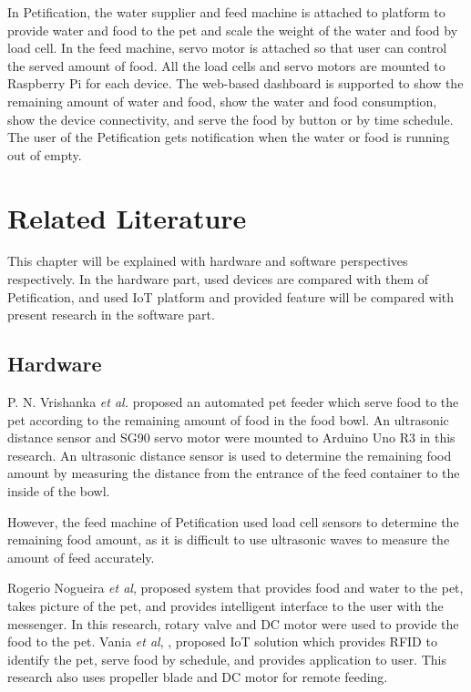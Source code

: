 \documentclass[conference]{IEEEtran}
\begin{document}
In Petification, the water supplier and feed machine is attached to platform to provide water and food to the pet and scale the weight of the water and food by load cell. In the feed machine, servo motor is attached so that user can control the served amount of food. All the load cells and servo motors are mounted to Raspberry Pi for each device.
The web-based dashboard is supported to show the remaining amount of water and food, show the water and food consumption, show the device connectivity, and serve the food by button or by time schedule. The user of the Petification gets notification when the water or food is running out of empty.

\section{Related Literature}
This chapter will be explained with hardware and software perspectives respectively. In the hardware part, used devices are compared with them of Petification, and used IoT platform and provided feature will be compared with present research in the software part.

\subsection{Hardware}
P. N. Vrishanka \textit{et al.} \cite{b11} proposed an automated pet feeder which serve food to the pet according to the remaining amount of food in the food bowl. An ultrasonic distance sensor and SG90 servo motor were mounted to Arduino Uno R3 in this research. An ultrasonic distance sensor is used to determine the remaining food amount by measuring the distance from the entrance of the feed container to the inside of the bowl.

However, the feed machine of Petification used load cell sensors to determine the remaining food amount, as it is difficult to use ultrasonic waves to measure the amount of feed accurately.

Rogerio Nogueira \textit{et al}, \cite{b12}  proposed system that provides food and water to the pet, takes picture of the pet, and provides intelligent interface to the user with the messenger. In this research, rotary valve and DC motor were used to provide the food to the pet. Vania \textit{et al}, \cite{b13}, proposed IoT solution which provides RFID to identify the pet, serve food by schedule, and provides application to user. This research also uses propeller blade and DC motor for remote feeding.
\end{document}
